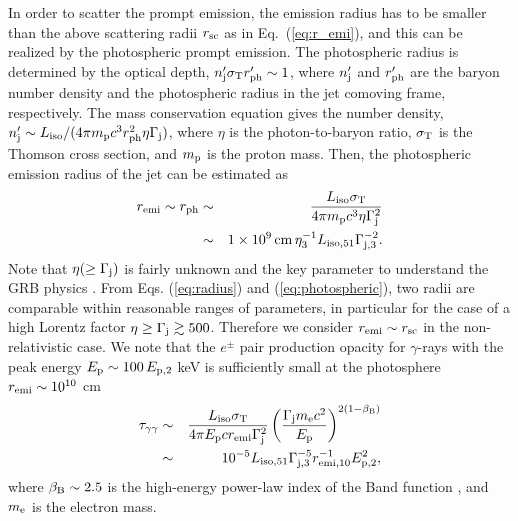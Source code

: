 \documentclass{emulateapj}
\begin{document}
In order to scatter the prompt emission, 
the emission radius has to be smaller than
the above scattering radii $r_{\rm sc}$ as in Eq.~(\ref{eq:r_emi}),
and this can be realized by the photospheric prompt emission.
The photospheric radius is determined by the optical depth, $n_{\rm j}'\sigma_{\rm T}r_{\rm ph}'\sim1$, 
where $n_{\rm j}'$ and $r_{\rm ph}'$ are the baryon number density and the photospheric radius 
in the jet comoving frame, respectively.
The mass conservation equation gives the number density, 
$n_{\rm j}'\sim L_{\rm iso}/(4\pi m_{\rm p}c^3r_{\rm ph}^2\eta\Gamma_{\rm j})$,
where $\eta$ is the photon-to-baryon ratio, $\sigma_{\rm T}$ is the Thomson cross section, 
and $m_{\rm p}$ is the proton mass.
Then, the photospheric emission radius of the jet 
can be estimated as \citep{2000ApJ...530..292M, 2006RPPh...69.2259M} 
\begin{eqnarray}\label{eq:photospheric}
r_{\rm emi} \sim r_{\rm ph} 
&\sim& \frac{L_{\rm iso}\sigma_{\rm T}}{4\pi m_{\rm p}c^3\eta\Gamma_{\rm j}^2} \nonumber \\
&\sim& 1\times10^{9}\,{\rm cm}\, \eta_3^{-1} L_{\rm iso, 51} \Gamma_{\rm j, 3}^{-2}.
\end{eqnarray}
Note that $\eta (\ge \Gamma_{\rm j})$ is fairly unknown and the key parameter to understand the GRB physics \citep[e.g., ][]{2000ApJ...530..292M, 2011PThPh.126..555I}. 
From Eqs. (\ref{eq:radius}) and (\ref{eq:photospheric}), 
two radii are comparable within reasonable ranges of parameters,
in particular for the case of a high Lorentz factor $\eta \ge \Gamma_{\rm j} \gtrsim 500$.
Therefore we consider $r_{\rm emi}\sim r_{\rm sc}$ in the non-relativistic case.
We note that the $e^{\pm}$ pair production opacity for 
$\gamma$-rays with the peak energy $E_{\rm p} \sim 100\,E_{\rm p,2}$ keV
is sufficiently small at the photosphere $r_{\rm emi}\sim10^{10}$ cm 
\citep[e.g., ][]{2001ApJ...555..540L, 2001ApJ...559..110Z, 2008ApJ...676.1123M}
\begin{eqnarray}\label{eq:compactness}
\tau_{\gamma\gamma}&\sim&\frac{L_{\rm iso}\sigma_{\rm T}}{4\pi E_{\rm p}cr_{\rm emi}\Gamma_{\rm j}^2}
\left(\frac{\Gamma_{\rm j} m_{\rm e} c^2}{E_{\rm p}}\right)^{2(1-\beta_{\rm B})}
\nonumber\\
&\sim& 10^{-5} L_{\rm iso,51}\Gamma_{\rm j,3}^{-5}r_{\rm emi,10}^{-1}E_{\rm p,2}^{2},
\end{eqnarray}
where $\beta_{\rm B}\sim2.5$ is the high-energy power-law index of the Band function \citep{1993ApJ...413..281B}, 
and $m_{\rm e}$ is the electron mass.
\end{document}
